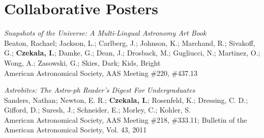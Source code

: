 \section*{Collaborative Posters}
\begin{etaremune}
\item \emph{Snapshots of the Universe: A Multi-Lingual Astronomy Art Book}\\
Beaton, Rachael; Jackson, L.; Carlberg, J.; Johnson, K.; Marchand, R.; Sivakoff, G.; \textbf{Czekala, I.}; Damke, G.; Dean, J.; Drosback, M.; Gugliucci, N.; Martinez, O.; Wong, A.; Zasowski, G.; Skies, Dark; Kids, Bright\\
American Astronomical Society, AAS Meeting \#220, \#437.13
\item \emph{Astrobites: The Astro-ph Reader's Digest For Undergraduates}\\
Sanders, Nathan; Newton, E. R.; \textbf{Czekala, I.}; Rosenfeld, K.; Dressing, C. D.; Gifford, D.; Suresh, J.; Schneider, E.; Morley, C.; Kohler, S.\\
American Astronomical Society, AAS Meeting \#218, \#333.11; Bulletin of the American Astronomical Society, Vol. 43, 2011
\end{etaremune}
